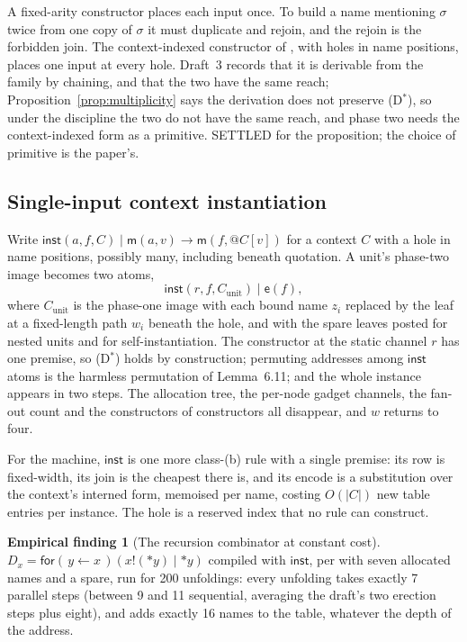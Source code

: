 \documentclass[11pt,a4paper]{article}
\makeatletter
\theoremstyle{plain}
\theoremstyle{definition}
\newtheorem{finding}[theorem]{Empirical finding}
\theoremstyle{remark}
\newcommand{\quo}[1]{@#1}
\newcommand{\drp}[1]{{*}#1}
\newcommand{\inp}[3]{\mathsf{for}(\,#1 \leftarrow #2\,)#3}
\newcommand{\out}[2]{#1!(#2)}
\newcommand{\red}{\longrightarrow}
\newcommand{\mm}{\mathsf{m}}
\newcommand{\ev}{\mathsf{e}}
\newcommand{\inst}{\mathsf{inst}}
\makeatother
\begin{document}
A fixed-arity constructor places each input once. To build a name mentioning
$\sigma$ twice from one copy of $\sigma$ it must duplicate and rejoin, and the
rejoin is the forbidden join. The context-indexed constructor of
\cite[Rem.~3.14]{rhocomb3}, with holes in name positions, places one input at
every hole. Draft~3 records that it is derivable from the family by chaining,
and that the two have the same reach; Proposition~\ref{prop:multiplicity} says
the derivation does not preserve (D$^{\ast}$), so under the discipline the two
do not have the same reach, and phase two needs the context-indexed form as a
primitive. \textsf{SETTLED} for the proposition; the choice of primitive is
the paper's.

\subsection{Single-input context instantiation}
\label{sec:ctxinst}

Write $\inst(a,f,C) \mid \mm(a,v) \red \mm(f,\quo{C[v]})$ for a context $C$
with a hole in name positions, possibly many, including beneath quotation. A
unit's phase-two image becomes two atoms,
\[
  \inst(r,f,C_{\mathrm{unit}}) \mid \ev(f),
\]
where $C_{\mathrm{unit}}$ is the phase-one image with each bound name $z_{i}$
replaced by the leaf at a fixed-length path $w_{i}$ beneath the hole, and with
the spare leaves posted for nested units and for self-instantiation. The
constructor at the static channel $r$ has one premise, so (D$^{\ast}$) holds
by construction; permuting addresses among $\inst$ atoms is the harmless
permutation of Lemma~6.11; and the whole instance appears in two steps. The
allocation tree, the per-node gadget channels, the fan-out count and the
constructors of constructors all disappear, and $w$ returns to four.

For the machine, $\inst$ is one more class-(b) rule with a single premise: its
row is fixed-width, its join is the cheapest there is, and its encode is a
substitution over the context's interned form, memoised per name, costing
$O(|C|)$ new table entries per instance. The hole is a reserved index that
no rule can construct.

\begin{finding}[The recursion combinator at constant cost]
\label{find:dx}
$D_{x} = \inp{y}{x}{(\out{x}{\drp{y}} \mid \drp{y})}$ compiled with
$\inst$, per \cite[Ex.~6.9]{rhocomb3} with seven allocated names and a spare,
run for 200 unfoldings: every unfolding takes exactly 7 parallel steps
(between 9 and 11 sequential, averaging the draft's two erection steps plus
eight), and adds exactly 16 names to the table, whatever the depth of the
address.
\end{finding}
\end{document}
